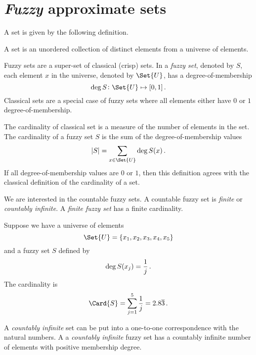 \documentclass[ ../main.tex]{subfiles}
\begin{document}
\section{\emph{Fuzzy} approximate sets}
A set is given by the following definition.
\begin{definition}
A set is an unordered collection of distinct elements from a universe of elements.
\end{definition}
Fuzzy sets are a super-set of classical (crisp) sets. In a \emph{fuzzy set}, denoted by $S$, each element $x$ in the universe, denoted by $\Set{U}$, has a degree-of-membership
\begin{equation}
    \FuzzyDeg{S} \colon \Set{U} \mapsto [0,1]\,.
\end{equation}
Classical sets are a special case of fuzzy sets where all elements either have $0$ or $1$ degree-of-membership.

The cardinality of classical set is a measure of the number of elements in the set. The cardinality of a fuzzy set $S$ is the sum of the degree-of-membership values
\begin{equation}
    |S| = \sum_{x \in \Set{U}} \FuzzyDeg{S}(x)\,.
\end{equation}
If all degree-of-membership values are $0$ or $1$, then this definition agrees with the classical definition of the cardinality of a set.

We are interested in the countable fuzzy sets. A countable fuzzy set is \emph{finite} or \emph{countably infinite}. A \emph{finite fuzzy set} has a finite cardinality.
\begin{example}
Suppose we have a universe of elements
\begin{equation}
    \Set{U} = \{ x_1, x_2, x_3, x_4, x_5 \}
\end{equation}
and a fuzzy set $S$ defined by
\begin{equation}
    \operatorname{deg}{S}(x_j) = \frac{1}{j}\,.
\end{equation}
The cardinality is
\begin{equation}
    \Card{S} = \sum_{j=1}^{5} \frac{1}{j} = 2.8\overline{3}\,.
\end{equation}
\end{example}
A \emph{countably infinite} set can be put into a one-to-one correspondence with the natural numbers. A a \emph{countably infinite} fuzzy set has a countably infinite number of elements with positive membership degree.
\end{document}
